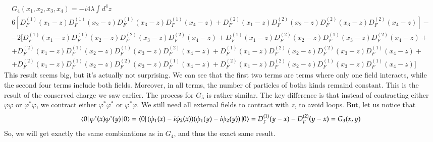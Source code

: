 \documentclass{article}
\begin{document}
\begin{equation}
\begin{gathered}
    G_4(x_1, x_2, x_3, x_4) = -i 4 \lambda \int d^4z \\
    6 \left[D_F^{(1)}(x_1 - z)D_F^{(1)}(x_2 - z)D_F^{(1)}(x_3 - z)D_F^{(1)}(x_4 - z) + D_F^{(2)}(x_1 - z)D_F^{(2)}(x_2 - z)D_F^{(2)}(x_3 - z)D_F^{(2)}(x_4 - z)\right] - \\ -
    2[
        D_F^{(1)}(x_1 - z)D_F^{(1)}(x_2 - z)D_F^{(2)}(x_3 - z)D_F^{(2)}(x_4 - z) +
        D_F^{(1)}(x_1 - z)D_F^{(2)}(x_2 - z)D_F^{(1)}(x_3 - z)D_F^{(2)}(x_4 - z) + \\ +
        D_F^{(2)}(x_1 - z)D_F^{(1)}(x_2 - z)D_F^{(1)}(x_3 - z)D_F^{(2)}(x_4 - z) +
        D_F^{(1)}(x_1 - z)D_F^{(2)}(x_2 - z)D_F^{(2)}(x_3 - z)D_F^{(1)}(x_4 - z) + \\ +
        D_F^{(2)}(x_1 - z)D_F^{(1)}(x_2 - z)D_F^{(2)}(x_3 - z)D_F^{(1)}(x_4 - z) +
        D_F^{(2)}(x_1 - z)D_F^{(2)}(x_2 - z)D_F^{(1)}(x_3 - z)D_F^{(1)}(x_4 - z)
    ]
\end{gathered}
\end{equation}
This result seems big, but it's actually not surprising. We can see that the first two terms are terms where only one field interacts, while the second four terms include both fields. Moreover, in all terms, the number of particles of boths kinds remaind constant. This is the result of the conserved charge we saw earlier.
\newline
The process for $G_5$ is rather similar. The key difference is that instead of contracting either $\varphi\varphi$ or $\varphi^*\varphi$, we contract either $\varphi^*\varphi^*$ or $\varphi^*\varphi$. We still need all external fields to contract with $z$, to avoid loops. But, let us notice that
\begin{equation}
    \bra{0}\varphi^*(x)\varphi^*(y)\ket{0} = \bra{0}(\phi_1(x) - i\phi_2(x))(\phi_1(y) - i\phi_2(y))\ket{0} = D_F^{(1)}(y - x) - D_F^{(2)}(y - x) = G_3(x, y)
\end{equation}
So, we will get exactly the same combinations as in $G_4$, and thus the exact same result.
\end{document}
